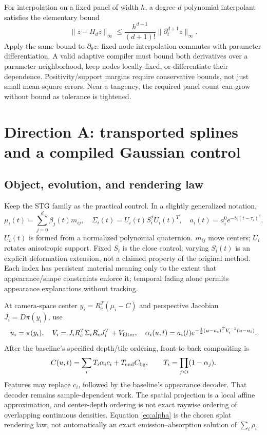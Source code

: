 \documentclass[10pt,letterpaper]{article}
\theoremstyle{remark}\newtheorem{counterexample}[proposition]{Counterexample}
\begin{document}
For interpolation on a fixed panel of width $h$, a degree-$d$ polynomial interpolant satisfies the elementary bound
\begin{equation}
 \|z-\Pi_dz\|_\infty\leq\frac{h^{d+1}}{(d+1)!}\|\partial_t^{d+1}z\|_\infty.
 \label{eq:interp}
\end{equation}
Apply the same bound to $\partial_\theta z$: fixed-node interpolation commutes with parameter differentiation. A valid adaptive compiler must bound both derivatives over a parameter neighborhood, keep nodes locally fixed, or differentiate their dependence. Positivity/support margins require conservative bounds, not just small mean-square errors. Near a tangency, the required panel count can grow without bound as tolerance is tightened.

\section{Direction A: transported splines and a compiled Gaussian control}

\subsection{Object, evolution, and rendering law}
Keep the STG family as the practical control. In a slightly generalized notation,
\begin{equation}
 \mu_i(t)=\sum_{j=0}^d\beta_j(t)m_{ij},\quad
 \Sigma_i(t)=U_i(t)S_i^2U_i(t)^T,\quad
 a_i(t)=a_i^0e^{-b_i(t-\tau_i)^2}. \label{eq:stg}
\end{equation}
$U_i(t)$ is formed from a normalized polynomial quaternion. $m_{ij}$ move centers; $U_i$ rotates anisotropic support. Fixed $S_i$ is the close control; varying $S_i(t)$ is an explicit deformation extension, not a claimed property of the original method. Each index has persistent material meaning only to the extent that appearance/shape constraints enforce it; temporal fading alone permits appearance explanations without tracking.

At camera-space center $y_i=R_c^T(\mu_i-C)$ and perspective Jacobian $J_i=D\pi(y_i)$, use
\begin{equation}
 u_i=\pi(y_i),\quad V_i=J_iR_c^T\Sigma_iR_cJ_i^T+V_{\rm filter},\quad
 \alpha_i(u,t)=a_i(t)e^{-\frac12(u-u_i)^TV_i^{-1}(u-u_i)}. \label{eq:splat}
\end{equation}
After the baseline's specified depth/tile ordering, front-to-back compositing is
\begin{equation}
 C(u,t)=\sum_iT_i\alpha_ic_i+T_{\rm end}C_{\rm bg},\qquad
 T_i=\prod_{j<i}(1-\alpha_j). \label{eq:alpha}
\end{equation}
Features may replace $c_i$, followed by the baseline's appearance decoder. That decoder remains sample-dependent work. The spatial projection is a local affine approximation, and center-depth ordering is not exact raywise ordering of overlapping continuous densities. Equation \eqref{eq:alpha} is the chosen splat rendering law, not automatically an exact emission--absorption solution of $\sum_i\rho_i$.
\end{document}
